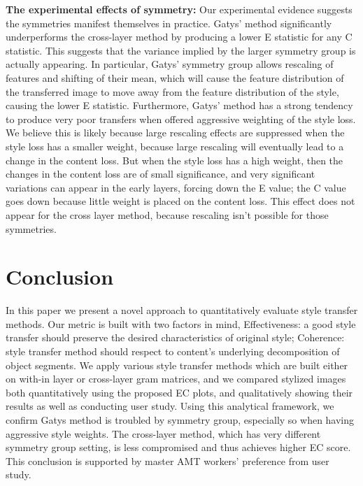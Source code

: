 \documentclass[runningheads]{llncs}
\begin{document}
{\bf The experimental effects of symmetry:}  Our experimental evidence suggests the symmetries manifest themselves in
practice. Gatys' method significantly underperforms the cross-layer method by producing a lower E statistic for any C
statistic.  This suggests that the variance implied by the larger symmetry group is actually appearing.  In particular,
Gatys' symmetry group allows rescaling of features and shifting of their mean, which will cause the feature distribution
of the transferred image to move away from the feature distribution of the style, causing the lower E statistic.
Furthermore, Gatys' method has a strong tendency to produce very poor transfers when offered aggressive weighting of the
style loss.  We believe this is likely because large rescaling effects are suppressed when the style loss has a smaller
weight, because large rescaling will eventually lead to a change in the content loss.  But when the style loss has a
high weight, then the changes in the content loss are of small significance, and very significant variations can appear in the
early layers, forcing down the E value; the C value goes down because little weight is placed on the content loss. This
effect does not appear for the cross layer method, because rescaling isn't possible for those symmetries.
\vspace{-2mm}
 \section{Conclusion}
 \vspace{-1mm}
 In this paper we present a novel approach to quantitatively evaluate style transfer methods. Our metric is built with two factors in mind, Effectiveness: a good style transfer should preserve the desired characteristics of original style; Coherence: style transfer method should respect to content's underlying decomposition of object segments. We apply various style transfer methods which are built either on with-in layer or cross-layer gram matrices, and we compared stylized images both quantitatively using the proposed EC plots, and qualitatively showing their results as well as conducting user study. Using this analytical framework, we confirm Gatys method is troubled by symmetry group, especially so when having aggressive style weights. The cross-layer method, which has very different symmetry group setting, is less compromised and thus achieves higher EC score. This conclusion is supported by master AMT workers' preference from user study.       

\end{document}
